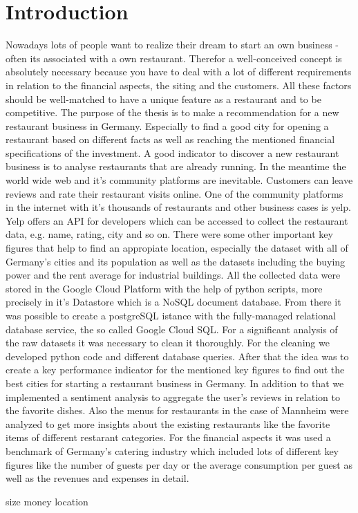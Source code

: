 \section{Introduction}
\label{sec:introduction}
Nowadays lots of people want to realize their dream to start an own business - often its associated with a own restaurant. Therefor a well-conceived concept is absolutely necessary because you have to deal with a lot of different requirements in relation to the financial aspects, the siting and the customers. All these factors should be well-matched to have a unique feature as a restaurant and to be competitive.
The purpose of the thesis is to make a recommendation for a new restaurant business in Germany. Especially to find a good city for opening a restaurant based on different facts as well as reaching the mentioned financial specifications of the investment.
A good indicator to discover a new restaurant business is to analyse restaurants that are already running. In the meantime the world wide web and it's community platforms are inevitable. Customers can leave reviews and rate their restaurant visits online. One of the community platforms in the internet with it's thousands of restaurants and other business cases is yelp. Yelp offers an API for developers which can be accessed to collect the restaurant data, e.g. name, rating, city and so on. There were some other important key figures that help to find an appropiate location, especially the dataset with all of Germany's cities and its population as well as the datasets including the buying power and the rent average for industrial buildings. All the collected data were stored in the Google Cloud Platform with the help of python scripts, more precisely in it's Datastore which is a NoSQL document database. From there it was possible to create a postgreSQL istance with the fully-managed relational database service, the so called Google Cloud SQL. For a significant analysis of the raw datasets it was necessary to clean it thoroughly. For the cleaning we developed python code and different database queries. After that the idea was to create a key performance indicator for the mentioned key figures to find out the best cities for starting a restaurant business in Germany. In addition to that we implemented a sentiment analysis to aggregate the user's reviews in relation to the favorite dishes. Also the menus for restaurants in the case of Mannheim were analyzed to get more insights about the existing restaurants like the favorite items of different restarant categories. For the financial aspects it was used a benchmark of Germany's catering industry which included lots of different key figures like the number of guests per day or the average consumption per guest as well as the revenues and expenses in detail.


size
money
location

